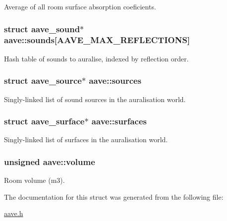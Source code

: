 Average of all room surface absorption coeficients. \hypertarget{structaave_aa637fd7286c95ab8322e391f461e825d}{
\subsubsection[{sounds}]{\setlength{\rightskip}{0pt plus 5cm}struct {\bf aave\-\_\-sound}$\ast$ aave\-::sounds\mbox{[}{\bf A\-A\-V\-E\-\_\-\-M\-A\-X\-\_\-\-R\-E\-F\-L\-E\-C\-T\-I\-O\-N\-S}\mbox{]}}}\label{structaave_aa637fd7286c95ab8322e391f461e825d}
Hash table of sounds to auralise, indexed by reflection order. \hypertarget{structaave_ad6f8dfdcb3403e1cf8e8b42c16851317}{
\subsubsection[{sources}]{\setlength{\rightskip}{0pt plus 5cm}struct {\bf aave\-\_\-source}$\ast$ aave\-::sources}}\label{structaave_ad6f8dfdcb3403e1cf8e8b42c16851317}
Singly-\/linked list of sound sources in the auralisation world. \hypertarget{structaave_ad7a69df05d26827f132c742551fb8871}{
\subsubsection[{surfaces}]{\setlength{\rightskip}{0pt plus 5cm}struct {\bf aave\-\_\-surface}$\ast$ aave\-::surfaces}}\label{structaave_ad7a69df05d26827f132c742551fb8871}
Singly-\/linked list of surfaces in the auralisation world. \hypertarget{structaave_a6d16180d7cb50c0255180a0102abfc2e}{
\subsubsection[{volume}]{\setlength{\rightskip}{0pt plus 5cm}unsigned aave\-::volume}}\label{structaave_a6d16180d7cb50c0255180a0102abfc2e}
Room volume (m3). 

The documentation for this struct was generated from the following file\-:\begin{DoxyCompactItemize}
\item 
\hyperlink{aave_8h}{aave.\-h}\end{DoxyCompactItemize}
